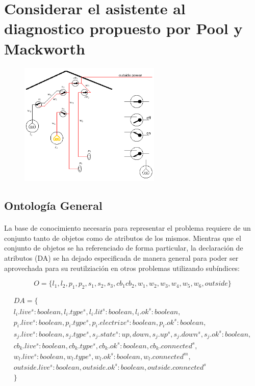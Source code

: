 \documentclass[10pt, a4paper,spanish]{article}
\begin{document}
	\clearpage
	\section{Considerar el asistente al diagnostico propuesto por Pool y Mackworth}

		\begin{figure}[H]
			\begin{center}
				\includegraphics[width=0.6\textwidth]{diagnostic-assistant}
			\end{center}
		\end{figure}

		\subsection{Ontología General}

			\paragraph{}
			La base de conocimiento necesaria para representar el problema requiere de un conjunto tanto de objetos como de atributos de los mismos. Mientras que el conjunto de objetos se ha referenciado de forma particular, la declaración de atributos (DA) se ha dejado especificada de manera general para poder ser aprovechada para su reutilziación en otros problemas utilizando subíndices:

			\begin{equation*}
				O = \{l_1, l_2, p_1, p_2, s_1, s_2, s_3, cb_1 cb_2, w_1, w_2, w_3, w_4, w_5, w_6, outside\}
			\end{equation*}

			\begin{multline*}
				DA = \{ \\
					l_i.live^s:boolean, l_i.type^s, l_i.lit^s:boolean, l_i.ok^s:boolean, \\
					p_i.live^s:boolean, p_i.type^s, p_i.electrize^s:boolean, p_i.ok^s:boolean, \\
					s_j.live^s:boolean, s_j.type^s, s_j.state^s:{up, down}, s_j.up^s, s_j.down^s, s_j.ok^s:boolean, \\
					cb_k.live^s:boolean, cb_k.type^s, cb_k.ok^s:boolean, cb_k.connected^s, \\
					w_l.live^s:boolean, w_l.type^s, w_l.ok^s:boolean, w_l.connected^m, \\
					outside.live^s:boolean, outside.ok^s:boolean, outside.connected^s \\
				\}
			\end{multline*}
\end{document}
